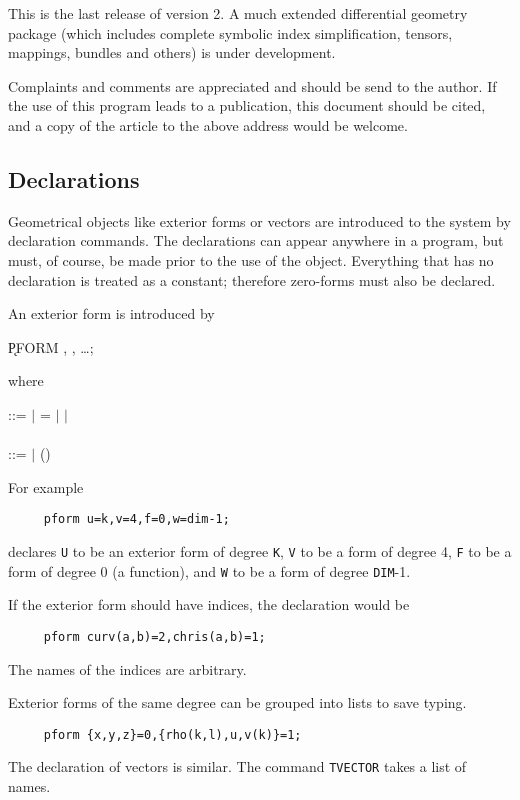 This is the last release of version 2. A much extended differential
geometry package (which includes complete symbolic index simplification,
tensors, mappings, bundles and others) is under development.

Complaints and comments are appreciated and should be send to the author.
If the use of this program leads to a publication, this document should
be cited, and a copy of the article to the above address would be
welcome.

\subsection{Declarations}

Geometrical objects like exterior forms or vectors are introduced to the
system by declaration commands.  The declarations can appear anywhere in
a program, but must, of course, be made prior to the use of the object.
Everything that has no declaration is treated as a constant; therefore
zero-forms must also be declared.

An exterior form is introduced by\label{PFORM} 

\hspace*{2em} \k{PFORM} , , \ldots;

where
\begin{tabbing}
 ::=  $\mid$ = $\mid$   $\mid$ \\
 \\
 ::=  $\mid$ ()
\end{tabbing}

For example
\begin{verbatim}
     pform u=k,v=4,f=0,w=dim-1;
\end{verbatim}
declares {\tt U} to be an exterior form of degree {\tt K}, {\tt V} to be a
form of degree 4, {\tt F} to be a form of degree 0 (a function), and {\tt W}
to be a form of degree {\tt DIM}-1.

If the exterior form should have indices, the declaration would be
\begin{verbatim}
     pform curv(a,b)=2,chris(a,b)=1;
\end{verbatim}
The names of the indices are arbitrary.

Exterior forms of the same degree can be grouped into lists to save typing.
\begin{verbatim}
     pform {x,y,z}=0,{rho(k,l),u,v(k)}=1;
\end{verbatim}
The declaration of vectors is similar. The command {\tt TVECTOR}\label{TVECTOR}
takes a list of names.  


